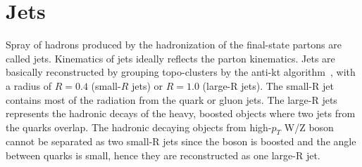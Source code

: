 \section{Jets}
Spray of hadrons produced by the hadronization of the final-state partons are called jets.
Kinematics of jets ideally reflects the parton kinematics.
Jets are basically reconstructed by grouping topo-clusters by the anti-kt algorithm~\cite{Cacciari_2008}, with a radius of $R = 0.4$ (small-$R$ jets) or $R = 1.0$ (large-R jets). 
The small-R jet contains most of the radiation from the quark or gluon jets. 
The large-R jets represents the hadronic decays of the heavy, boosted objects where two jets from the quarks overlap.
The hadronic decaying objects from high-$p_T$ W/Z boson cannot be separated as two small-R jets since the boson is boosted and the angle between quarks is small, hence they are reconstructed as one large-R jet.


